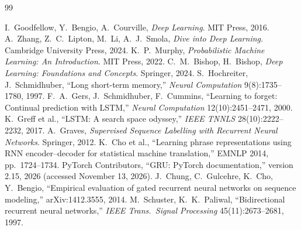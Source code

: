 \documentclass[11pt,a4paper]{article}
\begin{document}
\begin{thebibliography}{99}\small
{}
 I.~Goodfellow, Y.~Bengio, A.~Courville, \emph{Deep Learning}. MIT Press, 2016.
 A.~Zhang, Z.~C.~Lipton, M.~Li, A.~J.~Smola, \emph{Dive into Deep Learning}. Cambridge University Press, 2024.
 K.~P.~Murphy, \emph{Probabilistic Machine Learning: An Introduction}. MIT Press, 2022.
 C.~M.~Bishop, H.~Bishop, \emph{Deep Learning: Foundations and Concepts}. Springer, 2024.
 S.~Hochreiter, J.~Schmidhuber, ``Long short-term memory,'' \emph{Neural Computation} 9(8):1735--1780, 1997.
 F.~A.~Gers, J.~Schmidhuber, F.~Cummins, ``Learning to forget: Continual prediction with LSTM,'' \emph{Neural Computation} 12(10):2451--2471, 2000.
 K.~Greff et al., ``LSTM: A search space odyssey,'' \emph{IEEE TNNLS} 28(10):2222--2232, 2017.
 A.~Graves, \emph{Supervised Sequence Labelling with Recurrent Neural Networks}. Springer, 2012.
 K.~Cho et al., ``Learning phrase representations using RNN encoder--decoder for statistical machine translation,'' EMNLP 2014, pp.\ 1724--1734.
 PyTorch Contributors, ``GRU: PyTorch documentation,'' version 2.15, 2026 (accessed November 13, 2026).
 J.~Chung, C.~Gulcehre, K.~Cho, Y.~Bengio, ``Empirical evaluation of gated recurrent neural networks on sequence modeling,'' arXiv:1412.3555, 2014.
 M.~Schuster, K.~K.~Paliwal, ``Bidirectional recurrent neural networks,'' \emph{IEEE Trans.\ Signal Processing} 45(11):2673--2681, 1997.
\end{thebibliography}
\end{document}
